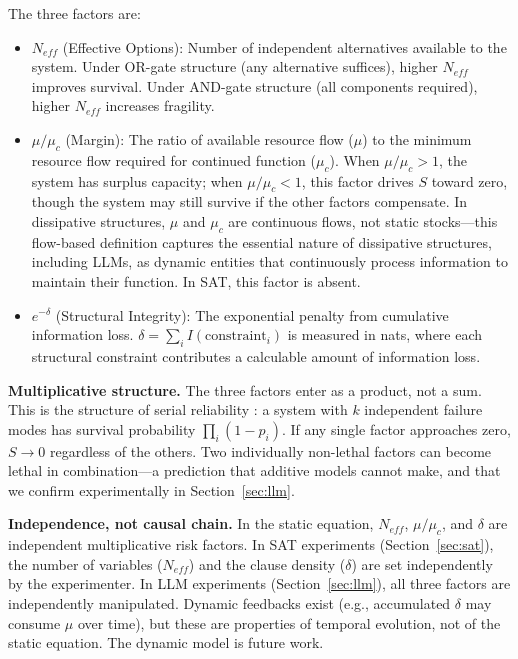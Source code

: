 \documentclass[11pt,a4paper]{article}
\begin{document}
The three factors are:
\begin{itemize}
    \item $N_{eff}$ (Effective Options): Number of independent alternatives available to the system. Under OR-gate structure (any alternative suffices), higher $N_{eff}$ improves survival. Under AND-gate structure (all components required), higher $N_{eff}$ increases fragility.
    \item $\mu/\mu_c$ (Margin): The ratio of available resource flow ($\mu$) to the minimum resource flow required for continued function ($\mu_c$). When $\mu/\mu_c > 1$, the system has surplus capacity; when $\mu/\mu_c < 1$, this factor drives $S$ toward zero, though the system may still survive if the other factors compensate. In dissipative structures, $\mu$ and $\mu_c$ are continuous flows, not static stocks---this flow-based definition captures the essential nature of dissipative structures, including LLMs, as dynamic entities that continuously process information to maintain their function. In SAT, this factor is absent.
    \item $e^{-\delta}$ (Structural Integrity): The exponential penalty from cumulative information loss. $\delta = \sum_i I(\text{constraint}_i)$ is measured in nats, where each structural constraint contributes a calculable amount of information loss.
\end{itemize}

\textbf{Multiplicative structure.} The three factors enter as a product, not a sum. This is the structure of serial reliability \citep{barlow1975}: a system with $k$ independent failure modes has survival probability $\prod_i (1 - p_i)$. If any single factor approaches zero, $S \to 0$ regardless of the others. Two individually non-lethal factors can become lethal in combination---a prediction that additive models cannot make, and that we confirm experimentally in Section~\ref{sec:llm}.

\textbf{Independence, not causal chain.} In the static equation, $N_{eff}$, $\mu/\mu_c$, and $\delta$ are independent multiplicative risk factors. In SAT experiments (Section~\ref{sec:sat}), the number of variables ($N_{eff}$) and the clause density ($\delta$) are set independently by the experimenter. In LLM experiments (Section~\ref{sec:llm}), all three factors are independently manipulated. Dynamic feedbacks exist (e.g., accumulated $\delta$ may consume $\mu$ over time), but these are properties of temporal evolution, not of the static equation. The dynamic model is future work.
\end{document}
